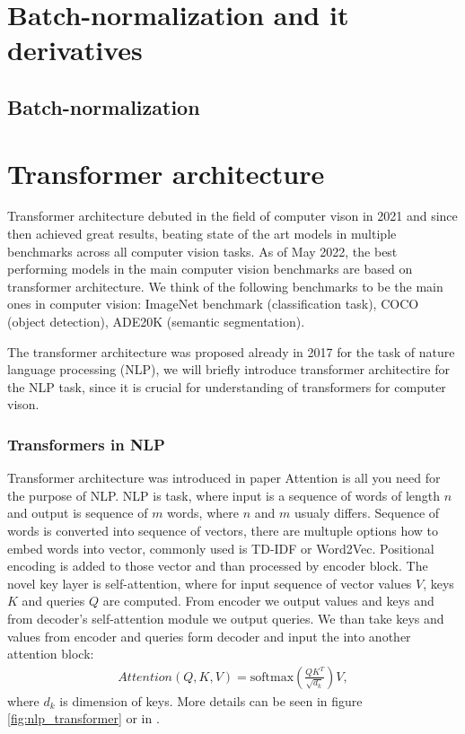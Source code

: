 \section{Batch-normalization and it derivatives}
\subsection{Batch-normalization}


\section{Transformer architecture}
Transformer architecture debuted in the field of computer vison in 2021 and since then achieved great results, beating state of the art models in multiple benchmarks across all computer vision tasks. As of May 2022, the best performing models in the main computer vision benchmarks are based on transformer architecture. We think of the following benchmarks to be the main ones in computer vision:  ImageNet benchmark (classification task), COCO (object detection), ADE20K (semantic segmentation).

The transformer architecture was proposed already in 2017 for the task of nature language processing (NLP), we will briefly introduce transformer architectire for the NLP task, since it is crucial for understanding of transformers for computer vison.

\subsubsection{Transformers in NLP}
Transformer architecture was introduced in paper Attention is all you need \cite{Vaswani2017} for the purpose of NLP. NLP is task, where input is a sequence of words of length $n$ and output is sequence of $m$ words, where $n$ and $m$ usualy differs. Sequence of words is converted into sequence of vectors, there are multuple options how to embed words into vector, commonly used is TD-IDF or Word2Vec\cite{Li2018}. Positional encoding is added to those vector and than processed by encoder block. The novel key layer is self-attention, where for input sequence of vector values $V$, keys $K$ and queries $Q$ are computed. From encoder we output values and keys and from decoder's self-attention module we output queries. We than take keys and values from encoder and queries form decoder and input the into another attention block:
\begin{align}
    Attention \left(Q,K,V \right) = \text{softmax} \left( \frac{QK^T}{\sqrt{d_k}} \right)V,
\end{align}
where $d_k$ is dimension of keys. More details can be seen in figure \ref{fig:nlp_transformer} or in \cite{Vaswani2017}.

